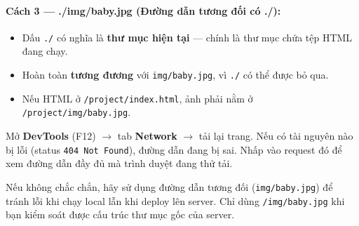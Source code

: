 \documentclass[11pt,oneside]{book}
\newcommand{\thd}[1]{\textcolor{white}{\textbf{\strut #1}}}
\newcommand{\codeinline}[1]{\textcolor{accentOrange}{\texttt{#1}}}
\begin{document}
\paragraph{Cách 3 — ./img/baby.jpg (Đường dẫn tương đối có ./):}
\begin{itemize}[leftmargin=1.5em, itemsep=2pt, parsep=0pt]
    \item Dấu \codeinline{./} có nghĩa là \textbf{thư mục hiện tại} — chính là thư mục chứa tệp HTML đang chạy.
    \item Hoàn toàn \textbf{tương đương} với \codeinline{img/baby.jpg}, vì \codeinline{./} có thể được bỏ qua.
    \item Nếu HTML ở \codeinline{/project/index.html}, ảnh phải nằm ở \codeinline{/project/img/baby.jpg}.
\end{itemize}

\begin{prettyTableBox}
\end{prettyTableBox}

\begin{tipBox}
Mở \textbf{DevTools} (F12) $\rightarrow$ tab \textbf{Network} $\rightarrow$ tải lại trang. Nếu có tài nguyên nào bị lỗi (status \codeinline{404 Not Found}), đường dẫn đang bị sai. Nhấp vào request đó để xem đường dẫn đầy đủ mà trình duyệt đang thử tải.
\end{tipBox}

\begin{tipBox}
Nếu không chắc chắn, hãy sử dụng đường dẫn tương đối (\codeinline{img/baby.jpg}) để tránh lỗi khi chạy local lẫn khi deploy lên server. Chỉ dùng \codeinline{/img/baby.jpg} khi bạn kiểm soát được cấu trúc thư mục gốc của server.
\end{tipBox}
\end{document}
